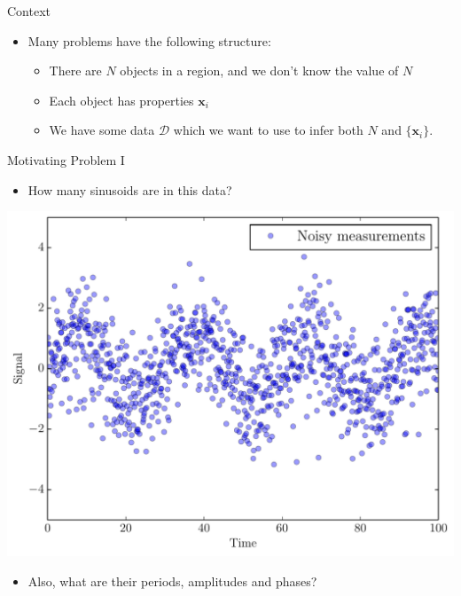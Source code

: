 
\begin{frame}[t,plain]
\titlepage
\end{frame}

\begin{frame}[t]{Context}
\begin{itemize}
\item Many problems have the following structure:
  \begin{itemize}
  \item There are $N$ objects in a region, and we don't know the value of $N$
  \item Each object has properties $\mathbf{x}_i$
  \item We have some data $\mathcal{D}$ which we want to use to infer both $N$
        and $\{\mathbf{x}_i\}$.
  \end{itemize}
\end{itemize}
\end{frame}

\begin{frame}[t]{Motivating Problem I}
\begin{itemize}
\item How many sinusoids are in this data?
\end{itemize}
\begin{center}
\includegraphics[scale=0.35]{sinewave_data.pdf}
\end{center}
\begin{itemize}
\item Also, what are their periods, amplitudes and phases?
\end{itemize}
\end{frame}

